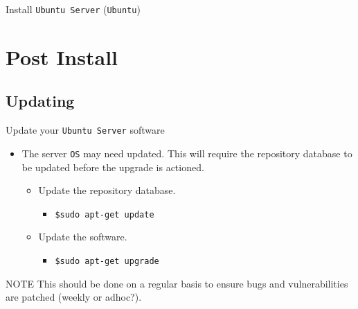 \documentclass{beamer}
\begin{document}
\begin{frame}{Install \texttt{Ubuntu Server} (\texttt{Ubuntu})}
\begin{figure}
\begin{overprint}
      \centering{}
    \end{overprint}
  \end{figure}
\end{frame}

\section{Post Install}
\subsection{Updating}
\begin{frame}{Update your \texttt{Ubuntu Server} software}
  \begin{itemize}
    \item The server \texttt{OS} may need updated. This will require the repository database to be updated before the upgrade is actioned.
      \begin{itemize}
        \item Update the repository database.
          \begin{itemize}
            \item \texttt{\$sudo apt-get update}
          \end{itemize}
        \item Update the software.
          \begin{itemize}
            \item \texttt{\$sudo apt-get upgrade}
          \end{itemize}
      \end{itemize}
  \end{itemize}
  \begin{block}{NOTE}
    This should be done on a regular basis to ensure bugs and vulnerabilities are patched (weekly or adhoc?). 
  \end{block}
\end{frame}
\end{document}
